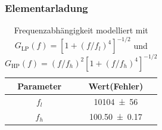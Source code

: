 \documentclass[sn-mathphys-num,iicol]{sn-jnl}
\theoremstyle{thmstyleone}
\theoremstyle{thmstyletwo}
\theoremstyle{thmstylethree}
\begin{document}
\subsubsection{Elementarladung}

\begin{table}[t]
    \centering
    \begin{tabular}{cc}
        \textbf{Parameter} & {\textbf{Wert(Fehler)}} \\
        \hline
        $f_l$ & \SI{10104 \pm 56}{} \\
        $f_h$ & \SI{100.50 \pm 0.17}{} \\
    \end{tabular}
    \caption{Frequenzabhängigkeit modelliert mit $G_\text{LP}(f)=\left[1+(f/f_l)^4\right]^{-1/2}$ und $G_\text{HP}(f)=(f/f_h)^2\left[1+(f/f_h)^4\right]^{-1/2}$} \label{tab:parameter}
\end{table}



\end{document}
